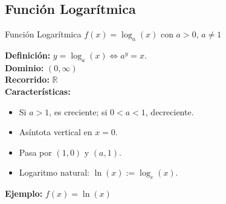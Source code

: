 \documentclass[12pt,a4paper]{article}
\begin{document}
\subsection{Función Logarítmica}
\begin{funcbox}{Función Logarítmica $f(x)=\log_a(x)$ con $a>0$, $a\neq 1$}
\begin{minipage}[t]{0.55\textwidth}
    \textbf{Definición:} $y=\log_a(x) \iff a^y=x$.\\
    \textbf{Dominio:} $(0,\infty)$\\
    \textbf{Recorrido:} $\mathbb{R}$\\
    \textbf{Características:}
    \begin{itemize}
        \item Si $a>1$, es creciente; si $0<a<1$, decreciente.
        \item Asíntota vertical en $x=0$.
        \item Pasa por $(1,0)$ y $(a,1)$.
        \item Logaritmo natural: $\ln(x):=\log_e(x)$.
    \end{itemize}
    \textbf{Ejemplo:} $f(x)=\ln(x)$
\end{minipage}\hfill
\begin{minipage}[t]{0.4\textwidth}
    \centering
\end{minipage}
\end{funcbox}

\end{document}
